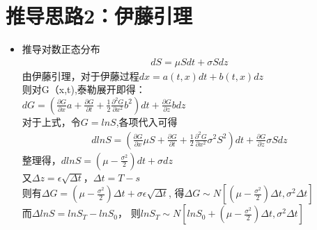 \documentclass{article}
\begin{document}
\section{推导思路2：伊藤引理}
\begin{itemize}
	\item 推导对数正态分布\\
\begin{align}
	dS = \mu Sdt + \sigma Sdz
\end{align}
	由伊藤引理，对于伊藤过程$ dx = a(t,x)dt + b(t,x)dz$\\
    则对G（x,t),泰勒展开即得：\\
    $dG = (\frac{\partial G}{\partial x}a + \frac{\partial G}{\partial t} +\frac{1}{2}\frac{\partial^2 G}{\partial x^2}b^2)dt
    +\frac{\partial G}{\partial z}bdz	$\\
    对于上式，令$ G = lnS $,各项代入可得\\
\begin{align} 
dlnS = (\frac{\partial G}{\partial x}\mu S + \frac{\partial G}{\partial t} +\frac{1}{2}\frac{\partial^2 G}{\partial x^2}\sigma^2 S^2)dt
+\frac{\partial G}{\partial z}\sigma Sdz 
\end{align}
	整理得，$dlnS = (\mu - \frac{\sigma^2}{2})dt +  \sigma dz$\\
	又$\Delta z = \epsilon\sqrt{\Delta t}$，$ \Delta t= T - s $\\
	则有$ \Delta G = (\mu - \frac{\sigma^2}{2})\Delta t 
	+ \sigma \epsilon\sqrt{\Delta t} $,
	得$\Delta G \sim N [ (\mu - \frac{\sigma^2}{2})\Delta t, \sigma^2 \Delta t]$\\
	而$\Delta lnS = lnS_{T} -lnS_{0}$，
	则$lnS_{T}\sim N[ lnS_{0} + (\mu - \frac{\sigma^2}{2})\Delta t, \sigma^2 \Delta t]$


\end{itemize}
\end{document}

